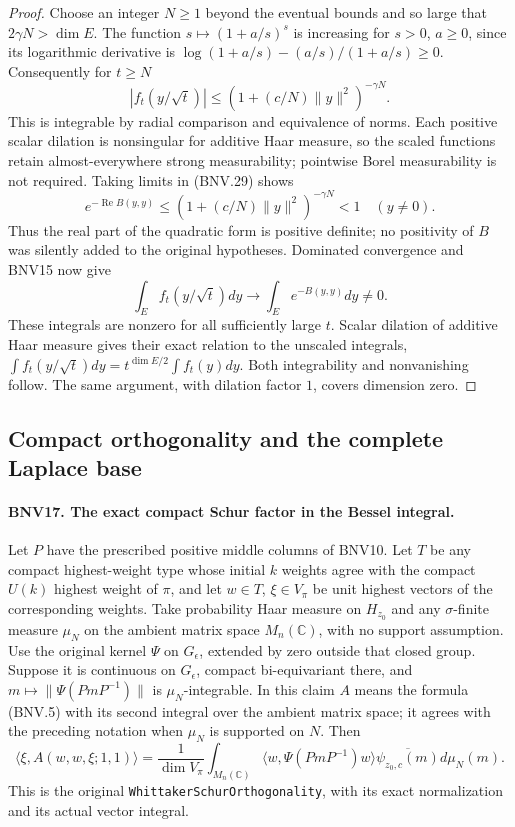 \documentclass[11pt,a4paper]{article}
\numberwithin{equation}{section}
\theoremstyle{remark}\newtheorem{remark}[theorem]{Remark}
\begin{document}
\begin{proof}
Choose an integer $N\ge1$ beyond the eventual bounds and so large that
$2\gamma N>\dim E$.  The function $s\mapsto(1+a/s)^s$ is increasing
for $s>0$, $a\ge0$, since its logarithmic derivative is
$\log(1+a/s)-(a/s)/(1+a/s)\ge0$.
Consequently for $t\ge N$
\[
 |f_t(y/\sqrt t)|\le
       (1+(c/N)\|y\|^2)^{-\gamma N}.
 \tag{BNV.29}
\]
This is integrable by radial comparison and equivalence of norms.
Each positive scalar dilation is nonsingular for additive Haar measure,
so the scaled functions retain almost-everywhere strong measurability;
pointwise Borel measurability is not required.
Taking limits in (BNV.29) shows
\[
 e^{-\operatorname{Re}B(y,y)}
 \le(1+(c/N)\|y\|^2)^{-\gamma N}<1\quad(y\ne0).
\]
Thus the real part of the quadratic form is positive definite; no
positivity of $B$ was silently added to the original hypotheses.
Dominated convergence and BNV15 now give
\[
 \int_E f_t(y/\sqrt t)dy
   \longrightarrow \int_E e^{-B(y,y)}dy\ne0.
\]
These integrals are nonzero for all sufficiently large $t$.  Scalar
dilation of additive Haar measure gives their exact relation to the
unscaled integrals,
$\int f_t(y/\sqrt t)dy=t^{\dim E/2}\int f_t(y)dy$.
Both integrability and nonvanishing follow.  The same argument, with
dilation factor $1$, covers dimension zero.
\end{proof}

\subsection{Compact orthogonality and the complete Laplace base}

\paragraph{BNV17. The exact compact Schur factor in the Bessel integral.}
\label{claim:BNV17}
Let $P$ have the prescribed positive middle columns of BNV10.
Let $T$ be any compact highest-weight type whose initial $k$ weights
agree with the compact $U(k)$ highest weight of $\pi$, and let $w\in T$,
$\xi\in V_\pi$ be unit highest vectors of the corresponding weights.
Take probability Haar measure on $H_{z_0}$ and any $\sigma$-finite
measure $\mu_N$ on the ambient matrix space $M_n(\mathbb C)$, with
no support assumption.  Use the original kernel $\Psi$ on $G_\epsilon$,
extended by zero outside that closed group.  Suppose it is continuous
on $G_\epsilon$, compact bi-equivariant there, and
$m\mapsto\|\Psi(PmP^{-1})\|$ is $\mu_N$-integrable.  In this claim
$A$ means the formula (BNV.5) with its second integral over the ambient
matrix space; it agrees with the preceding notation when $\mu_N$ is
supported on $N$.  Then
\[
 \langle\xi,A(w,w,\xi;1,1)\rangle
 =\frac1{\dim V_\pi}
       \int_{M_n(\mathbb C)}\langle w,\Psi(PmP^{-1})w\rangle
                     \overline{\psi_{z_0,c}(m)}d\mu_N(m).
 \tag{BNV.30}
\]
This is the original \texttt{Whittaker\allowbreak Schur\allowbreak Orthogonality}, with its exact
normalization and its actual vector integral.
\end{document}
